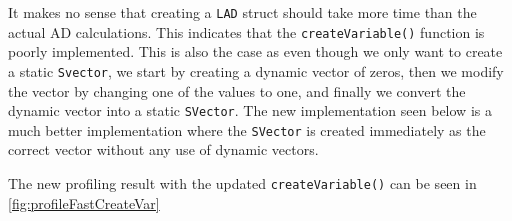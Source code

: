 It makes no sense that creating a \texttt{LAD} struct should take more time than the actual AD calculations. This indicates that the \texttt{createVariable()} function is poorly implemented. This is also the case as even though we only want to create a static \texttt{Svector}, we start by creating a dynamic vector of zeros, then we modify the vector by changing one of the values to one, and finally we convert the dynamic vector into a static \texttt{SVector}. The new implementation seen below is a much better implementation where the \texttt{SVector} is created immediately as the correct vector without any use of dynamic vectors.

The new profiling result with the updated \texttt{createVariable()} can be seen in \autoref{fig:profileFastCreateVar}


